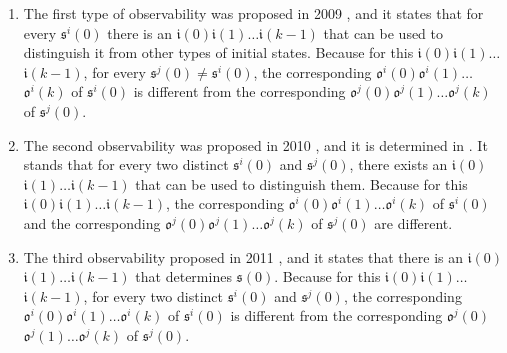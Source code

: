 

\begin{enumerate}
	\item The first type of observability was proposed in 2009 \cite{cheng2009controllability}, and it states that for every $\mathfrak{s}^{i}(0)$ there is an $\mathfrak{i}(0)$$\mathfrak{i}(1)\ldots$$\mathfrak{i}(k-1)$ that can be used to distinguish it from other types of initial states. Because for this $\mathfrak{i}(0)$$\mathfrak{i}(1)\ldots$$\mathfrak{i}(k-1)$, for every $\mathfrak{s}^{j}(0)\ne$$\mathfrak{s}^{i}(0)$, the corresponding $\mathfrak{o}^{i}(0)$$\mathfrak{o}^{i}(1)\ldots$$\mathfrak{o}^{i}(k)$ of $\mathfrak{s}^{i}(0)$ is different from the corresponding $\mathfrak{o}^{j}(0)$$\mathfrak{o}^{j}(1)\ldots$$\mathfrak{o}^{j}(k)$ of $\mathfrak{s}^{j}(0)$. %
	\item 
	The second observability was proposed in 2010 \cite{Zhao2010Input}, and it is determined in \cite{Li2015Controllability}. It stands that for every two distinct $\mathfrak{s}^{i}(0)$ and $\mathfrak{s}^{j}(0)$, there exists an $\mathfrak{i}(0)$$\mathfrak{i}(1)\ldots$$\mathfrak{i}(k-1)$ that can be used to distinguish them. Because for this $\mathfrak{i}(0)$$\mathfrak{i}(1)\ldots$$\mathfrak{i}(k-1)$, the corresponding $\mathfrak{o}^{i}(0)$$\mathfrak{o}^{i}(1)\ldots$$\mathfrak{o}^{i}(k)$ of $\mathfrak{s}^{i}(0)$ and the corresponding $\mathfrak{o}^{j}(0)$$\mathfrak{o}^{j}(1)\ldots$$\mathfrak{o}^{j}(k)$ of $\mathfrak{s}^{j}(0)$ are different. %
	\item The third observability proposed in 2011 \cite{Cheng2011Identification}, and it states that there is an $\mathfrak{i}(0)$$\mathfrak{i}(1)\ldots$$\mathfrak{i}(k-1)$ that determines $\mathfrak{s}(0)$. Because for this $\mathfrak{i}(0)$$\mathfrak{i}(1)\ldots$$\mathfrak{i}(k-1)$, for every two distinct $\mathfrak{s}^{i}(0)$ and $\mathfrak{s}^{j}(0)$, the corresponding $\mathfrak{o}^{i}(0)$$\mathfrak{o}^{i}(1)\ldots$$\mathfrak{o}^{i}(k)$ of $\mathfrak{s}^{i}(0)$ is different from the corresponding $\mathfrak{o}^{j}(0)$$\mathfrak{o}^{j}(1)\ldots$$\mathfrak{o}^{j}(k)$ of $\mathfrak{s}^{j}(0)$.
	

\end{enumerate}
